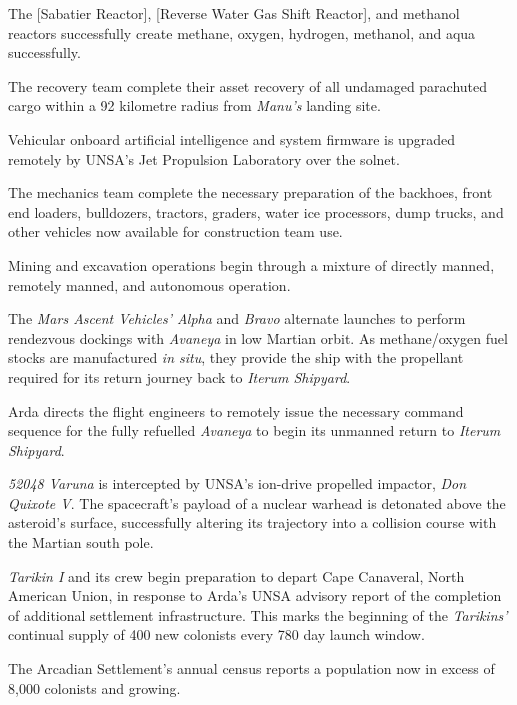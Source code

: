 The [Sabatier Reactor], [Reverse Water Gas Shift Reactor], and methanol reactors successfully create methane, oxygen, hydrogen, methanol, and aqua successfully.
\StopTimelineDate

The recovery team complete their asset recovery of all undamaged parachuted cargo within a 92 kilometre radius from {\it Manu's} landing site.
\StopTimelineDate

Vehicular onboard artificial intelligence and system firmware is upgraded remotely by UNSA's Jet Propulsion Laboratory over the solnet.

The mechanics team complete the necessary preparation of the backhoes, front end loaders, bulldozers, tractors, graders, water ice processors, dump trucks, and other vehicles now available for construction team use.

Mining and excavation operations begin through a mixture of directly manned, remotely manned, and autonomous operation.
\StopTimelineDate

The {\it Mars Ascent Vehicles' Alpha} and {\it Bravo} alternate launches to perform rendezvous dockings with {\it Avaneya} in low Martian orbit. As methane/oxygen fuel stocks are manufactured {\it in situ}, they provide the ship with the propellant required for its return journey back to {\it Iterum Shipyard}.
\StopTimelineDate

Arda directs the flight engineers to remotely issue the necessary command sequence for the fully refuelled {\it Avaneya} to begin its unmanned return to {\it Iterum Shipyard}.
\StopTimelineDate

{\it 52048 Varuna} is intercepted by UNSA's ion-drive propelled impactor, {\it Don Quixote V}. The spacecraft's payload of a nuclear warhead is detonated above the asteroid's surface, successfully altering its trajectory into a collision course with the Martian south pole.
\StopTimelineDate

{\it Tarikin I} and its crew begin preparation to depart Cape Canaveral, North American Union, in response to Arda's UNSA advisory report of the completion of additional settlement infrastructure. This marks the beginning of the {\it Tarikins'} continual supply of 400 new colonists every 780 day launch window.
\StopTimelineDate

The Arcadian Settlement's annual census reports a population now in excess of 8,000 colonists and growing.
\StopTimelineDate

